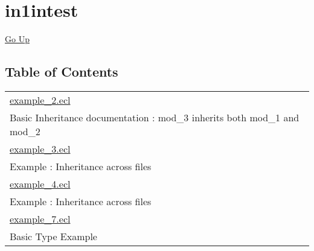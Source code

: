 \chapter*{\color{headtoc} in1intest}
\hypertarget{ecldoc:toc:root/intest/in1intest}{}
\hyperlink{ecldoc:toc:}{Go Up}


\section*{Table of Contents}
{\renewcommand{\arraystretch}{1.5}
\begin{longtable}{|p{\textwidth}|}
\hline
\hyperlink{ecldoc:toc:intest.in1intest.example_2}{example\_2.ecl} \\
Basic Inheritance documentation : mod\_3 inherits both mod\_1 and mod\_2 \\
\hline
\hyperlink{ecldoc:toc:intest.in1intest.example_3}{example\_3.ecl} \\
Example : Inheritance across files \\
\hline
\hyperlink{ecldoc:toc:intest.in1intest.example_4}{example\_4.ecl} \\
Example : Inheritance across files \\
\hline
\hyperlink{ecldoc:toc:intest.in1intest.example_7}{example\_7.ecl} \\
Basic Type Example \\
\hline
\end{longtable}
}





